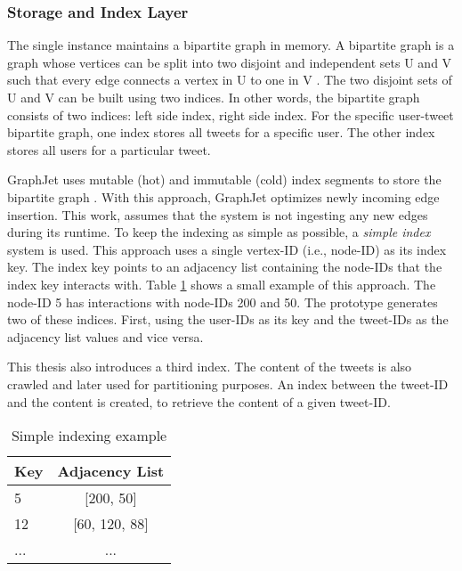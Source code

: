 
\subsubsection{Storage and Index Layer}
\label{subsub:storage-index-layer}
The single instance maintains a bipartite graph in memory. A bipartite graph is a graph whose vertices can be split into two disjoint and independent sets U and V such that every edge connects a vertex in U to one in V \cite{skienaImplementingDiscreteMathematics1991}. The two disjoint sets of U and V can be built using two indices. In other words, the bipartite graph consists of two indices: left side index, right side index. For the specific user-tweet bipartite graph, one index stores all tweets for a specific user. The other index stores all users for a particular tweet.


GraphJet uses mutable (hot) and immutable (cold) index segments to store the bipartite graph \cite{sharmaGraphJetRealtimeContent2016}. With this approach, GraphJet optimizes newly incoming edge insertion. This work, assumes that the system is not ingesting any new edges during its runtime. To keep the indexing as simple as possible, a \emph{simple index} system is used. This approach uses a single vertex-ID (i.e., node-ID) as its index key. The index key points to an adjacency list containing the node-IDs that the index key interacts with. Table \ref{tab:simple-indexing} shows a small example of this approach. The node-ID 5 has interactions with node-IDs 200 and 50. The prototype generates two of these indices. First, using the user-IDs as its key and the tweet-IDs as the adjacency list values and vice versa.


This thesis also introduces a third index. The content of the tweets is also crawled and later used for partitioning purposes. An index between the tweet-ID and the content is created, to retrieve the content of a given tweet-ID.

\begin{table}[!h]
    \centering
    \caption{Simple indexing example}
    \label{tab:simple-indexing}
    \begin{tabular}{|l|c|}
        \hline
        \textbf{Key} & \textbf{Adjacency List} \\
        \hline
        5 & [200, 50] \\
        \hline
        12 & [60, 120, 88] \\
        \hline
        ... & ... \\
        \hline
    \end{tabular}
\end{table}


